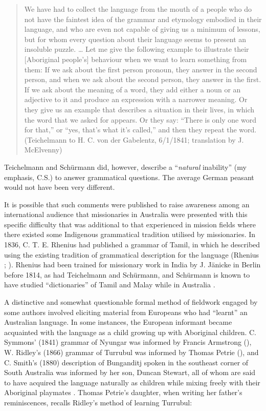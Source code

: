 \begin{quote}
    We have had to collect the language from the mouth of a people who do not have the faintest idea of the grammar and etymology embodied in their language, and who are even not capable of giving us a minimum of lessons, but for whom every question about their language seems to present an insoluble puzzle. … Let me give the following example to illustrate their [Aboriginal people’s] behaviour when we want to learn something from them: If we ask about the first person pronoun, they answer in the second person, and when we ask about the second person, they answer in the first. If we ask about the meaning of a word, they add either a noun or an adjective to it and produce an expression with a narrower meaning. Or they give us an example that describes a situation in their lives, in which the word that we asked for appears. Or they say: “There is only one word for that,” or “yes, that’s what it’s called,” and then they repeat the word. (Teichelmann to H. C. von der Gabelentz, 6/1/1841; translation by J. McElvenny)
\end{quote}

\newpage
Teichelmann and Schürmann \citeyearpar[v]{teichelmann_outlines_1840} did, however, describe a “\textit{natural} inability” (my emphasis, C.S.) to answer grammatical questions. The average German peasant would not have been very different.

It is possible that such comments were published to raise awareness among an international audience that missionaries in Australia were presented with this specific difficulty that was additional to that experienced in mission fields where there existed some Indigenous grammatical tradition utilised by missionaries. In 1836, C. T. E. Rhenius had published a grammar of Tamil, in which he described using the existing tradition of grammatical description for the language (Rhenius \citeyear[i]{rhenius_grammar_1836}; ). Rhenius had been trained for missionary work in India by J. Jänicke in Berlin before 1814, as had Teichelmann and Schürmann, and Schürmann is known to have studied “dictionaries” of Tamil and Malay while in Australia \citep[67]{rathjen_difficult_1998}.

A distinctive and somewhat questionable formal method of fieldwork engaged by some authors involved eliciting material from Europeans who had “learnt” an Australian language. In some instances, the European informant became acquainted with the language as a child growing up with Aboriginal children. C. Symmons’ (1841) grammar of Nyungar was informed by Francis Armstrong (), W. Ridley’s (1866) grammar of Turrubul was informed by Thomas Petrie (), and C. Smith’s (1880) description of Bunganditj spoken in the southeast corner of South Australia \citeyearpar{smith_booandik_1880} was informed by her son, Duncan Stewart, all of whom are said to have acquired the language naturally as children while mixing freely with their Aboriginal playmates \citep{gunson_australian_2016}. Thomas Petrie’s daughter, when writing her father’s reminiscences, recalls Ridley’s method of learning Turrubul:

